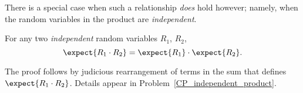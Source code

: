 There is a special case when such a relationship \emph{does} hold
however; namely, when the random variables in the product are
\emph{independent}.

\begin{theorem}\label{th:prod}
For any two \emph{independent} random variables $R_1$, $R_2$,
\[
\expect{R_1 \cdot R_2} = \expect{R_1} \cdot \expect{R_2}.
\]
\end{theorem}

The proof follows by judicious rearrangement of terms in the sum that
defines $\expect{R_1 \cdot R_2}$.  Details appear in
Problem~\ref{CP_independent_product}.

\iffalse
\begin{proof}
The event $[R_1 \cdot R_2=r]$ can be split up into events of the form
$[R_1 = r_1\ \text{ and }\ R_2 = r_2]$ where $r_1\cdot r_2=r$.  So
\begin{align*}
\lefteqn{\expect{R_1 \cdot R_2}}\\
& \eqdef \sum_{r \in \range{R_1\cdot R_2}} r\cdot \pr{R_1\cdot R_2=r}\\
\iffalse
& =      \sum_{\scriptsize \begin{aligned}
                       r_1 \in \range{R_1},\\
                       r_2 \in \range{R_2}
                      \end{aligned}}\fi
& =      \sum_{r_i \in \range{R_i}}
            r_1 r_2 \cdot \pr{R_1=r_1\ \text{ and }\ R_2=r_2}\\
& =      \sum_{r_1 \in \range{R_1}} \sum_{r_2 \in \range{R_2}}
            r_1 r_2 \cdot \pr{R_1=r_1\ \text{ and }\ R_2=r_2}
                    &\text{(ordering terms in the sum)}\\
& =      \sum_{r_1 \in \range{R_1}} \sum_{r_2 \in \range{R_2}}
            r_1 r_2 \cdot \pr{R_1=r_1}\cdot \pr{R_2=r_2}
                    &\text{(indep.\ of $R_1,R_2$)}\\
& =      \sum_{r_1 \in \range{R_1}} \paren{r_1\pr{R_1=r_1} \cdot
              \sum_{r_2 \in \range{R_2}} r_2 \pr{R_2=r_2}}
                    &\text{(factoring out $r_1\pr{R_1=r_1}$)}\\
& =      \sum_{r_1 \in \range{R_1}} r_1\pr{R_1=r_1} \cdot \expect{R_2}
                    &\text{(def of $\expect{R_2}$)}\\
& =       \expect{R_2} \cdot \sum_{r_1 \in \range{R_1}} r_1\pr{R_1=r_1}
                    &\text{(factoring out $\expect{R_2}$)}\\
& =       \expect{R_2} \cdot  \expect{R_1}.
                    &\text{(def of $\expect{R_1}$)}
\end{align*}

\end{proof}
\fi

